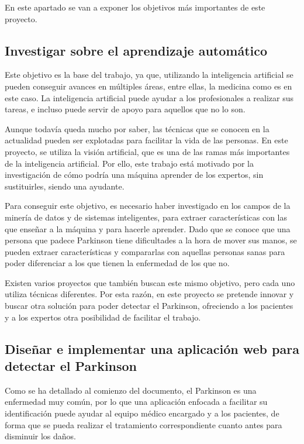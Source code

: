 
En este apartado se van a exponer los objetivos más importantes de este proyecto.

\subsection{Investigar sobre el aprendizaje automático}
Este objetivo es la base del trabajo, ya que, utilizando la inteligencia artificial se pueden conseguir avances en múltiples áreas, entre ellas, la medicina como es en este caso. La inteligencia artificial puede ayudar a los profesionales a realizar sus tareas, e incluso puede servir de apoyo para aquellos que no lo son.

Aunque todavía queda mucho por saber, las técnicas que se conocen en la actualidad pueden ser explotadas para facilitar la vida de las personas. En este proyecto, se utiliza la visión artificial, que es una de las ramas más importantes de la inteligencia artificial. Por ello, este trabajo está motivado por la investigación de cómo podría una máquina aprender de los expertos, sin sustituirles, siendo una ayudante.

Para conseguir este objetivo, es necesario haber investigado en los campos de la minería de datos y de sistemas inteligentes, para extraer características con las que enseñar a la máquina y para hacerle aprender. Dado que se conoce que una persona que padece Parkinson tiene dificultades a la hora de mover sus manos, se pueden extraer características y compararlas con aquellas personas sanas para poder diferenciar a los que tienen la enfermedad de los que no.

Existen varios proyectos que también buscan este mismo objetivo, pero cada uno utiliza técnicas diferentes. Por esta razón, en este proyecto se pretende innovar y buscar otra solución para poder detectar el Parkinson, ofreciendo a los pacientes y a los expertos otra posibilidad de facilitar el trabajo.

\subsection{Diseñar e implementar una aplicación web para detectar el Parkinson}
Como se ha detallado al comienzo del documento, el Parkinson es una enfermedad muy común, por lo que una aplicación enfocada a facilitar su identificación puede ayudar al equipo médico encargado y a los pacientes, de forma que se pueda realizar el tratamiento correspondiente cuanto antes para disminuir los daños.

